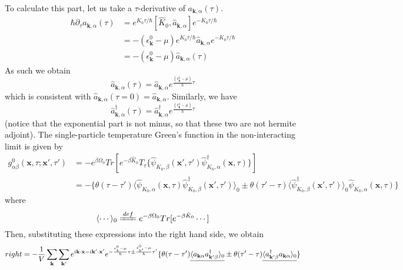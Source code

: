 To calculate this part, let us take a $\tau$-derivative of $a_{\mathbf{k},\alpha}(\tau)$.
$$
\begin{aligned}
\hbar\partial_{\tau}a_{\mathbf{k},\alpha}(\tau) & = e^{K_{0}\tau/\hbar} [\hat{K}_{0},\hat{a}_{\mathbf{k},\alpha}] e^{-K_{0}\tau/\hbar}\\
&=-(\epsilon_{\mathbf{k}}^{0}-\mu) e^{K_{0}\tau/\hbar} \hat{a}_{\mathbf{k},\alpha} e^{-K_{0}\tau/\hbar}\\
&=-(\epsilon_{\mathbf{k}}^{0}-\mu)\hat{a}_{\mathbf{k},\alpha}(\tau)
\end{aligned}
$$
As such we obtain
\begin{equation} \label{4.1.A}
\hat{a}_{\mathbf{k},\alpha}(\tau)=\hat{a}_{\mathbf{k},\alpha}e^{\frac{(\epsilon_{\mathbf{k}}^{0}-\mu)}{\hbar}\tau}
\end{equation}
which is consistent with $\hat{a}_{\mathbf{k},\alpha}(\tau=0)=\hat{a}_{\mathbf{k},\alpha}$.
Similarly, we have
\[ \label{4.1.B}
\hat{a}_{\mathbf{k},\alpha}^{\dagger}(\tau)=\hat{a}_{\mathbf{k},\alpha}^{\dagger}e^{\frac{(\epsilon_{\mathbf{k}}^{0}-\mu)}{\hbar}\tau} \tag{$4.1.22^\prime$}
\]
(notice that the exponential part is not minus, so that these two are not hermite adjoint).
The single-particle temperature Green's function in the non-interacting limit is given by
\begin{equation}\label{eq2}
\begin{aligned}
g_{\alpha\beta}^{0}(\mathbf{x},\tau;\mathbf{x'},\tau')&=-e^{\beta\Omega_{0}}Tr\left[e^{-\beta\hat{K}_{0}} T_{\tau}\{\hat{\psi}_{K_{0},\beta}(\mathbf{x'},\tau') \hat{\psi}_{K_{0},\alpha}^{\dagger}(\mathbf{x},\tau)\}\right]\\
&=-\{\theta(\tau-\tau')\langle\hat{\psi}_{K_{0},\alpha}(\mathbf{x},\tau)\hat{\psi}_{K_{0},\beta}^{\dagger}(\mathbf{x'},\tau')\rangle_{0} \pm\theta(\tau'-\tau)\langle\hat{\psi}_{K_{0},\beta}^{\dagger}(\mathbf{x'},\tau')\rangle_{0}\hat{\psi}_{K_{0},\alpha}(\mathbf{x},\tau)\}
\end{aligned}
\end{equation}
where
$$
\langle\cdots\rangle_{0}\xlongequal{def} e^{-\beta\Omega_{0}}Tr[e^{-\beta\hat{K}_{0}}\cdots]
$$
Then, substituting these expressions into the right hand side, we obtain
$$
right=-\frac{1}{V}\sum_{\mathbf{k}}\sum_{\mathbf{k'}}e^{i\mathbf{k}\cdotp\mathbf{x}-i\mathbf{k'}\cdotp\mathbf{x'}} e^{-\frac{\epsilon_{k}^{0}-\mu}{\hbar}\tau\pm\frac{\epsilon_{k'}^{0}-\mu}{\hbar}\tau'} \{\theta(\tau-\tau') \uline{\langle a_{\mathbf{k}\alpha} a_{\mathbf{k'}\beta}^{\dagger}\rangle_{0}} \pm\theta(\tau'-\tau) \uline{\langle a_{\mathbf{k'}\beta}^{\dagger} a_{\mathbf{k}\alpha}\rangle_{0}}\}
$$
